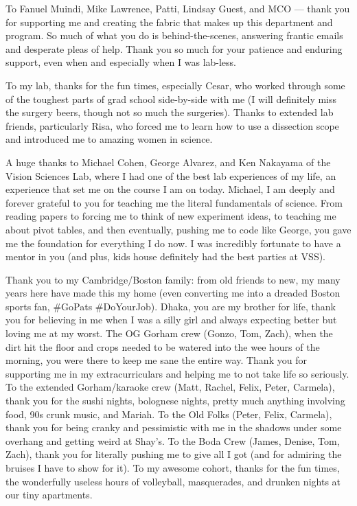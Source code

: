 To Fanuel Muindi, Mike Lawrence, Patti, Lindsay Guest, and MCO --- thank you for supporting me and creating the fabric that makes up this department and program. So much of what you do is behind-the-scenes, answering frantic emails and desperate pleas of help. Thank you so much for your patience and enduring support, even when and especially when I was lab-less. 

To my lab, thanks for the fun times, especially Cesar, who worked through some of the toughest parts of grad school side-by-side with me (I will definitely miss the surgery beers, though not so much the surgeries). Thanks to extended lab friends, particularly Risa, who forced me to learn how to use a dissection scope and introduced me to amazing women in science. 

A huge thanks to Michael Cohen, George Alvarez, and Ken Nakayama of the Vision Sciences Lab, where I had one of the best lab experiences of my life, an experience that set me on the course I am on today. Michael, I am deeply and forever grateful to you for teaching me the literal fundamentals of science. From reading papers to forcing me to think of new experiment ideas, to teaching me about pivot tables, and then eventually, pushing me to code like George, you gave me the foundation for everything I do now. I was incredibly fortunate to have a mentor in you (and plus, kids house definitely had the best parties at VSS).

Thank you to my Cambridge/Boston family: from old friends to new, my many years here have made this my home (even converting me into a dreaded Boston sports fan, \#GoPats \#DoYourJob). Dhaka, you are my brother for life, thank you for believing in me when I was a silly girl and always expecting better but loving me at my worst. The OG Gorham crew (Gonzo, Tom, Zach), when the dirt hit the floor and crops needed to be watered into the wee hours of the morning, you were there to keep me sane the entire way. Thank you for supporting me in my extracurriculars and helping me to not take life so seriously. To the extended Gorham/karaoke crew (Matt, Rachel, Felix, Peter, Carmela), thank you for the sushi nights, bolognese nights, pretty much anything involving food, 90s crunk music, and Mariah. To the Old Folks (Peter, Felix, Carmela), thank you for being cranky and pessimistic with me in the shadows under some overhang and getting weird at Shay's. To the Boda Crew (James, Denise, Tom, Zach), thank you for literally pushing me to give all I got (and for admiring the bruises I have to show for it). To my awesome cohort, thanks for the fun times, the wonderfully useless hours of volleyball, masquerades, and drunken nights at our tiny apartments. 

